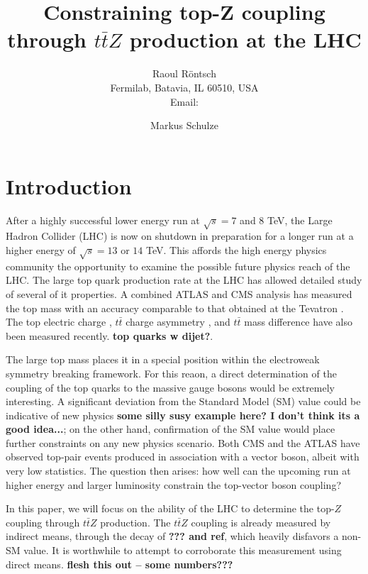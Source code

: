 \documentclass[preprint]{JHEP3} %
\title{Constraining top-Z coupling through $t\bar{t}Z$ production at the LHC}
\author{Raoul R\"ontsch \\ Fermilab, Batavia, IL 60510, USA \\
  Email: \email{rontsch@fnal.gov} }
\author{Markus Schulze}
\def\ttbZ{t\bar{t}Z}
\def\ttb{t\bar{t}}
\begin{document}
\section{Introduction}
After a highly successful lower energy run at $\sqrt{s}=7$ and $8$ TeV, the Large Hadron Collider (LHC) is now on shutdown in preparation for a longer run at a higher energy of $\sqrt{s}=13$ or $14$ TeV. This affords the high energy physics community the opportunity to examine the possible future physics reach of the LHC. The large top quark production rate at the LHC has allowed detailed study of several of it properties. A combined ATLAS and CMS analysis \cite{ATLAS-CONF-2013-102} has measured the top mass with an accuracy comparable to that obtained at the Tevatron \cite{}. The top electric charge \cite{Aad:2013uza}, $\ttb$ charge asymmetry \cite{CMS-PAS-TOP-12-033}, and $\ttb$ mass difference \cite{Aad:2013eva} have also been measured recently. {\bf top quarks w dijet?}. 

The large top mass places it in a special position within the electroweak symmetry breaking framework. For this reaon, a direct determination of the coupling of the top quarks to the massive gauge bosons would be extremely interesting.  A significant deviation from the Standard Model (SM) value could be indicative of new physics {\bf some silly susy example here? I don't think its a good idea...}; on the other hand, confirmation of the SM value would place further constraints on any new physics scenario. Both CMS \cite{Chatrchyan:2013qca} and the ATLAS \cite{ATLAS-CONF-2012-126} have observed top-pair events produced in association with a vector boson, albeit with very low statistics. The question then arises: how well can the upcoming run at higher energy and larger luminosity constrain the top-vector boson coupling?

In this paper, we will focus on the ability of the LHC to determine the top-$Z$ coupling through $\ttbZ$ production. The $\ttbZ$ coupling is already measured by indirect means, through the decay of {\bf ??? and ref}, which heavily disfavors a non-SM value. It is worthwhile to attempt to corroborate this measurement using direct means. {\bf flesh this out -- some numbers???}
\end{document}
